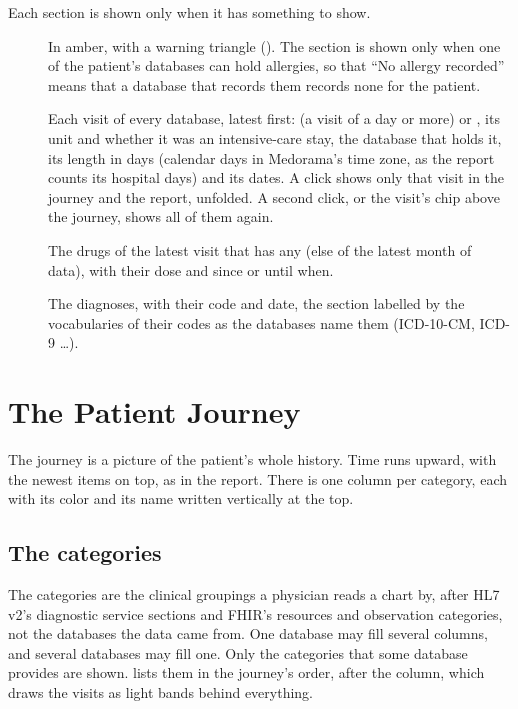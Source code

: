Each section is shown only when it has something to show.
\begin{description}
\item[] In amber, with a warning triangle (\ui{$\blacktriangle$}). The section is
  shown only when one of the patient's databases can hold allergies, so that ``No allergy
  recorded'' means that a database that records them records none for the patient.
\item[] Each visit of every database, latest first:  (a visit of a day or
  more) or , its unit and whether it was an intensive-care stay, the database that
  holds it, its length in days (calendar days in Medorama's time zone, as the report counts its
  hospital days) and its dates. A click shows only that visit in the journey and
  the report, unfolded. A second click, or the visit's chip above the journey, shows all of them
  again.
\item[] The drugs of the latest visit that has any (else of the latest month of
  data), with their dose and since or until when.
\item[] The diagnoses, with their code and date, the section labelled by the
  vocabularies of their codes as the databases name them (ICD-10-CM, ICD-9 \ldots).
\end{description}

\section{The Patient Journey}
\label{sec:patients-journey}

The journey is a picture of the patient's whole history. Time runs upward, with the newest
items on top, as in the report. There is one column per category, each with its color and its
name written vertically at the top.

\subsection{The categories}
\label{sec:patients-categories}

The categories are the clinical groupings a physician reads a chart by, after HL7 v2's
diagnostic service sections and FHIR's resources and observation categories, not the
databases the data came from. One database may fill several columns, and several databases may
fill one. Only the categories that some database provides are shown. 
lists them in the journey's order, after the  column, which draws the visits as
light bands behind everything.

